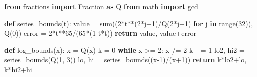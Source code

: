 \documentclass[
  11pt,
  a4paper,
]{article}
\newenvironment{Shaded}{}{}
\newcommand{\BuiltInTok}[1]{\textcolor[rgb]{0.00,0.50,0.00}{#1}}
\newcommand{\ControlFlowTok}[1]{\textcolor[rgb]{0.00,0.44,0.13}{\textbf{#1}}}
\newcommand{\DecValTok}[1]{\textcolor[rgb]{0.25,0.63,0.44}{#1}}
\newcommand{\ImportTok}[1]{\textcolor[rgb]{0.00,0.50,0.00}{\textbf{#1}}}
\newcommand{\KeywordTok}[1]{\textcolor[rgb]{0.00,0.44,0.13}{\textbf{#1}}}
\newcommand{\NormalTok}[1]{#1}
\newcommand{\OperatorTok}[1]{\textcolor[rgb]{0.40,0.40,0.40}{#1}}
\begin{document}
\begin{Shaded}
\begin{Highlighting}[]
\ImportTok{from}\NormalTok{ fractions }\ImportTok{import}\NormalTok{ Fraction }\ImportTok{as}\NormalTok{ Q}
\ImportTok{from}\NormalTok{ math }\ImportTok{import}\NormalTok{ gcd}

\KeywordTok{def}\NormalTok{ series\_bounds(t):}
\NormalTok{    value }\OperatorTok{=} \BuiltInTok{sum}\NormalTok{((}\DecValTok{2}\OperatorTok{*}\NormalTok{t}\OperatorTok{**}\NormalTok{(}\DecValTok{2}\OperatorTok{*}\NormalTok{j}\OperatorTok{+}\DecValTok{1}\NormalTok{)}\OperatorTok{/}\NormalTok{Q(}\DecValTok{2}\OperatorTok{*}\NormalTok{j}\OperatorTok{+}\DecValTok{1}\NormalTok{) }\ControlFlowTok{for}\NormalTok{ j }\KeywordTok{in} \BuiltInTok{range}\NormalTok{(}\DecValTok{32}\NormalTok{)), Q(}\DecValTok{0}\NormalTok{))}
\NormalTok{    error }\OperatorTok{=} \DecValTok{2}\OperatorTok{*}\NormalTok{t}\OperatorTok{**}\DecValTok{65}\OperatorTok{/}\NormalTok{(}\DecValTok{65}\OperatorTok{*}\NormalTok{(}\DecValTok{1}\OperatorTok{{-}}\NormalTok{t}\OperatorTok{*}\NormalTok{t))}
    \ControlFlowTok{return}\NormalTok{ value, value}\OperatorTok{+}\NormalTok{error}

\KeywordTok{def}\NormalTok{ log\_bounds(x):}
\NormalTok{    x }\OperatorTok{=}\NormalTok{ Q(x)}
\NormalTok{    k }\OperatorTok{=} \DecValTok{0}
    \ControlFlowTok{while}\NormalTok{ x }\OperatorTok{\textgreater{}=} \DecValTok{2}\NormalTok{:}
\NormalTok{        x }\OperatorTok{/=} \DecValTok{2}
\NormalTok{        k }\OperatorTok{+=} \DecValTok{1}
\NormalTok{    lo2, hi2 }\OperatorTok{=}\NormalTok{ series\_bounds(Q(}\DecValTok{1}\NormalTok{, }\DecValTok{3}\NormalTok{))}
\NormalTok{    lo, hi }\OperatorTok{=}\NormalTok{ series\_bounds((x}\OperatorTok{{-}}\DecValTok{1}\NormalTok{)}\OperatorTok{/}\NormalTok{(x}\OperatorTok{+}\DecValTok{1}\NormalTok{))}
    \ControlFlowTok{return}\NormalTok{ k}\OperatorTok{*}\NormalTok{lo2}\OperatorTok{+}\NormalTok{lo, k}\OperatorTok{*}\NormalTok{hi2}\OperatorTok{+}\NormalTok{hi}


\end{Highlighting}
\end{Shaded}
\end{document}
